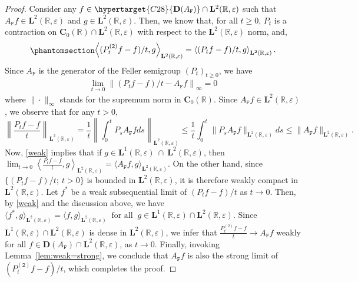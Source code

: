 \documentclass[12pt]{amsart}
\newcommand{\hlabel}{\phantomsection\label}
\newcommand{\hptg}[2]{\hypertarget{#1}{#2}}
\numberwithin{equation}{section}
\newcommand{\bb}{\mathbb}
\renewcommand{\ge}{\geqslant}
\renewcommand{\le}{\leqslant}
\newcommand{\hpt}[2]{#2}
\newcommand{\ttt}{\mathtt}
\newcommand{\bmrm}[2][2]{\mathbf{#2}^{#1}}
\newcommand{\C}{\mathbf{C}}
\newcommand{\D}{\mathbf{D}}
\theoremstyle{definition}
\theoremstyle{assump}
\theoremstyle{remark}
\begin{document}
\begin{proof}
Consider any $f\in\hptg{C28}{\D(A_\ttt{F})}\cap\bmrm{L}(\bb R,\varepsilon)$ such that $A_\ttt{F}f\in\bmrm{L}(\bb{R},\varepsilon)$ and $g\in\bmrm{L}(\bb{R},\varepsilon)$. Then, we know that, for all $t\ge 0$,
\hpt{R20}{$P_t$ is a contraction on $\C_0(\bb{R})\cap \bmrm{L}(\bb{R},\varepsilon)$
with respect to the $\bmrm{L}(\bb{R},\varepsilon)$ norm}, and,
\begin{equation}\hlabel{weak}
\begin{aligned}
 \left\langle(P^{(\ttt{2})}_tf-f)/t,g\right\rangle_{\bmrm{L}(\bb{R},\varepsilon)}=\left\langle (P_tf-f)/t,g\right\rangle_{\bmrm{L}(\bb{R},\varepsilon)}.
\end{aligned}
\end{equation}
Since $A_\ttt{F}$ is the generator of the Feller semigroup $(P_t)_{t\ge 0}$, we have
\begin{align*}
\lim_{t\to 0}\left\|(P_t f-f)/t-A_\ttt{F} f\right\|_{\infty}= 0
\end{align*}
where $\|\cdot\|_{\infty}$ stands for the supremum norm in $\C_0(\bb R)$. Since $A_\ttt{F} f\in\bmrm{L}(\bb{R},\varepsilon)$, we observe that for any $t>0$,
\begin{equation*}
\left\|\frac{P_t f-f}{t}\right\|_{\hpt{R21}{\bmrm{L}(\bb{R},\varepsilon)}}=\frac{1}{t}\left\|\int_0^t P_s A_\ttt{F} fds\right\|_{\bmrm{L}(\bb{R},\varepsilon)}\le\frac{1}{t}\int_0^t \|P_s A_\ttt{F} f\|_{\bmrm{L}(\bb{R},\varepsilon)}ds\le \|A_\ttt{F} f\|_{\bmrm{L}(\bb{R},\varepsilon)}.
\end{equation*}
Now, \eqref{weak} implies that if $g\in\mathbf{L}^1(\bb{R},\varepsilon)\ \cap\ \mathbf{L}^2(\bb{R},\varepsilon)$, then
$
\lim_{t\to 0}\left\langle\frac{P_t f-f}{t},g\right\rangle_{\bmrm{L}(\bb{R},\varepsilon)}=\langle A_\ttt{F} f,g\rangle_{\bmrm{L}(\bb{R},\varepsilon)}.
$
On the other hand, since $\{(P_tf-f)/t ; \: t>0\}$ is bounded in $\mathbf{L}^2(\bb R,\varepsilon)$, it is therefore weakly compact in $\mathbf{L}^2(\bb R,\varepsilon)$. Let $f^*$ be a weak subsequential limit of $(P_tf-f)/t$ as $t\to 0$. Then, by \eqref{weak} and the discussion above, we have
$
\langle f^*,g\rangle_{\bmrm{L}(\bb{R},\varepsilon)}=\langle f,g\rangle_{\bmrm{L}(\bb{R},\varepsilon)} \ \mbox{ for all }  \ g\in\mathbf{L}^1(\bb{R},\varepsilon)\cap\bmrm{L}(\bb{R},\varepsilon).
$
Since $\mathbf{L}^1(\bb{R},\varepsilon)\cap\bmrm{L}(\bb{R},\varepsilon)$ is dense in $\bmrm{L}(\bb{R},\varepsilon)$, we infer that
$\frac{P^{(2)}_tf-f}{t}\to A_\ttt{F} f$ weakly for all $f\in\D(A_\ttt{F})\cap\bmrm{L}(\bb{R},\varepsilon)$, as $t\to 0$. Finally, invoking Lemma~\ref{lem:weak=strong}, we conclude that $A_\ttt{F} f$ is also the strong limit of $(P^{(\ttt{2})}_t f-f)/t$, which completes  the proof.
\end{proof}
\end{document}
